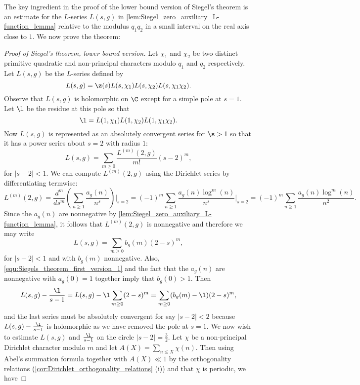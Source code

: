     The key ingredient in the proof of the lower bound version of Siegel's theorem is an estimate for the $L$-series $L(s,g)$ in \cref{lem:Siegel_zero_auxiliary_L-function_lemma} relative to the modulus $q_{1}q_{2}$ in a small interval on the real axis close to $1$. We now prove the theorem:

    \begin{proof}[Proof of Siegel's theorem, lower bound version]
      Let $\chi_{1}$ and $\chi_{2}$ be two distinct primitive quadratic and non-principal characters modulo $q_{1}$ and $q_{2}$ respectively. Let $L(s,g)$ be the $L$-series defined by
      \[
        L(s,g) = \z(s)L(s,\chi_{1})L(s,\chi_{2})L(s,\chi_{1}\chi_{2}).
      \]
      Observe that $L(s,g)$ is holomorphic on $\C$ except for a simple pole at $s = 1$. Let $\l$ be the residue at this pole so that
      \[
        \l = L(1,\chi_{1})L(1,\chi_{2})L(1,\chi_{1}\chi_{2}).
      \]
     Now $L(s,g)$ is represented as an absolutely convergent series for $\s > 1$ so that it has a power series about $s = 2$ with radius $1$:
      \[
        L(s,g) = \sum_{m \ge 0}\frac{L^{(m)}(2,g)}{m!}(s-2)^{m},
      \]
      for $|s-2| < 1$. We can compute $L^{(m)}(2,g)$ using the Dirichlet series by differentiating termwise:
      \begin{equation}\label{equ:Siegels_theorem_first_version_1}
        L^{(m)}(2,g) = \frac{d^{m}}{ds^{m}}\left(\sum_{n \ge 1}\frac{a_{g}(n)}{n^{s}}\right)\Bigg|_{s = 2} = (-1)^{m}\sum_{n \ge 1}\frac{a_{g}(n)\log^{m}(n)}{n^{s}}\Bigg|_{s = 2} = (-1)^{m}\sum_{n \ge 1}\frac{a_{g}(n)\log^{m}(n)}{n^{2}}.
      \end{equation}
      Since the $a_{g}(n)$ are nonnegative by \cref{lem:Siegel_zero_auxiliary_L-function_lemma}, it follows that $L^{(m)}(2,g)$ is nonnegative and therefore we may write
      \[
        L(s,g) = \sum_{m \ge 0}b_{g}(m)(2-s)^{m},
      \]
      for $|s-2| < 1$ and with $b_{g}(m)$ nonnegative. Also, \cref{equ:Siegels_theorem_first_version_1} and the fact that the $a_{g}(n)$ are nonnegative with $a_{g}(0) = 1$ together imply that $b_{g}(0) > 1$. Then
      \begin{equation}\label{equ:Siegels_theorem_first_version_2}
        L(s,g)-\frac{\l}{s-1} = L(s,g)-\l\sum_{m \ge 0}(2-s)^{m} = \sum_{m \ge 0}(b_{g}(m)-\l)(2-s)^{m},
      \end{equation}
      and the last series must be absolutely convergent for say $|s-2| < 2$ because $L(s,g)-\frac{\l}{s-1}$ is holomorphic as we have removed the pole at $s = 1$. We now wish to estimate $L(s,g)$ and $\frac{\l}{s-1}$ on the circle $|s-2| = \frac{3}{2}$. Let $\chi$ be a non-principal Dirichlet character modulo $m$ and let $A(X) = \sum_{n \le X}\chi(n)$. Then using Abel's summation formula together with $A(X) \ll 1$ by the orthogonality relations (\cref{cor:Dirichlet_orthogonality_relations} (i)) and that $\chi$ is periodic, we have

\end{proof}
